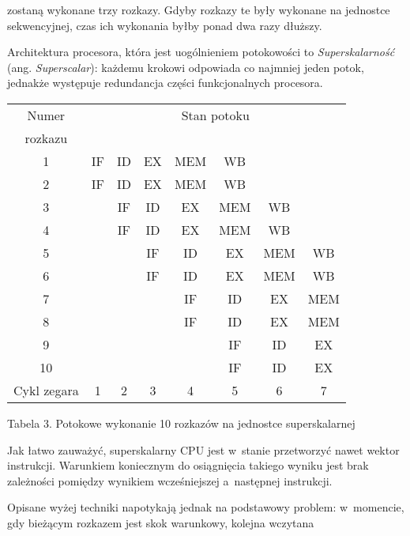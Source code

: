 \documentclass{mwart}
\begin{document}
	zostaną wykonane trzy rozkazy. Gdyby rozkazy te były wykonane na jednostce sekwencyjnej, czas ich wykonania byłby ponad dwa razy dłuższy.
\par
%
\indent
	Architektura procesora, która jest uogólnieniem potokowości to \emph{Superskalarność} (ang. \emph{Superscalar}): 
	każdemu krokowi odpowiada co najmniej jeden potok, jednakże występuje redundancja części funkcjonalnych procesora.
	\begin{center}
	\begin{tabular}{|c|c|c|c|c|c|c|c|} \hline
	Numer 		 & \multicolumn{7}{c|}{Stan potoku} \\
	rozkazu & \multicolumn{7}{c|}{} \\ \hline
	1 & IF & ID & EX & \cellcolor{yellow} MEM & WB & & \\ \hline
	2 & IF & ID & EX & \cellcolor{yellow} MEM & WB & & \\ \hline
	3 & & IF & ID & \cellcolor{yellow} EX & MEM & WB & \\ \hline
	4 & & IF & ID & \cellcolor{yellow} EX & MEM & WB & \\ \hline
	5 & & & IF & \cellcolor{yellow} ID & EX & MEM & WB \\ \hline
	6 & & & IF & \cellcolor{yellow} ID & EX & MEM & WB \\ \hline
	7 & & & & \cellcolor{yellow} IF & ID & EX & MEM \\ \hline
	8 & & & & \cellcolor{yellow} IF & ID & EX & MEM \\ \hline
	9 & & & & \cellcolor{yellow} & IF & ID & EX \\ \hline \hline
	10 & & & & \cellcolor{yellow} & IF & ID & EX \\ \hline \hline
	Cykl zegara & 1 & 2 & 3 & \cellcolor{yellow} 4 & 5 & 6 & 7 \\ \hline
	\end{tabular}\par
	\begin{small} Tabela 3. Potokowe wykonanie 10 rozkazów na jednostce superskalarnej\end{small}
	\end{center}
	Jak łatwo zauważyć, superskalarny CPU jest w~stanie przetworzyć nawet wektor instrukcji. Warunkiem koniecznym do osiągnięcia takiego
	wyniku jest brak zależności pomiędzy wynikiem wcześniejszej a~następnej instrukcji.
\par
%
\indent
	Opisane wyżej techniki napotykają jednak na podstawowy problem: w~momencie, gdy bieżącym rozkazem jest skok warunkowy, kolejna wczytana 
\end{document}
